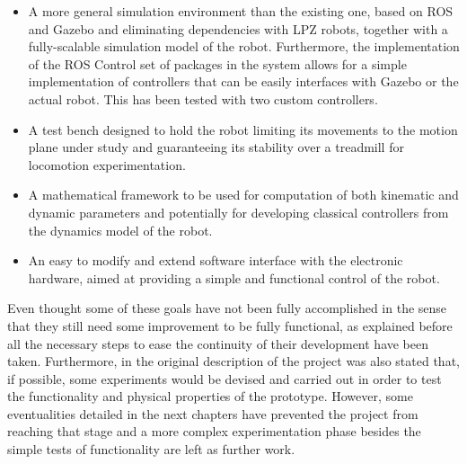 \begin{itemize}
\label{list:goals}
\item A more general simulation environment than the existing one, based on ROS and Gazebo and eliminating dependencies with LPZ robots, together with a fully-scalable simulation model of the robot. Furthermore, the implementation of the ROS Control set of packages \cite{ros_control} in the system allows for a simple implementation of controllers that can be easily interfaces with Gazebo or the actual robot. This has been tested with two custom controllers.
\item A test bench designed to hold the robot limiting its movements to the motion plane under study and guaranteeing its stability over a treadmill for locomotion experimentation. 
\item A mathematical framework to be used for computation of both kinematic and dynamic parameters and potentially for developing classical controllers from the dynamics model of the robot.
\item An easy to modify and extend software interface with the electronic hardware, aimed at providing a simple and functional control of the robot.
\end{itemize}

Even thought some of these goals have not been fully accomplished in the sense that they still need some improvement to be fully functional, as explained before all the necessary steps to ease the continuity of their development have been taken.
Furthermore, in the original description of the project was also stated that, if possible, some experiments would be devised and carried out in order to test the functionality and physical properties of the prototype. 
However, some eventualities detailed in the next chapters have prevented the project from reaching that stage and a more complex experimentation phase besides the simple tests of functionality are left as further work.
